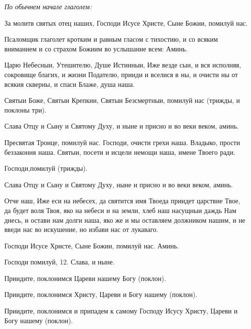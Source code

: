 \itshape По обычнем начале глаголем:\normalfont{}


За молитв святых отец наших, Господи Исусе Христе, Сыне Божии, помилуй нас.

Псаломщик глаголет кротким и равным гласом с тихостию, и со всяким вниманием и со страхом Божиим во услышание всем: Аминь.

Царю Небесныи, Утешителю, Душе Истинныи, Иже везде сыи, и вся исполняя, сокровище благих, и жизни Подателю, прииди и вселися в ны, и очисти ны от всякия скверны, и спаси Блаже, душа наша.

Святыи Боже, Святыи Крепкии, Святыи Безсмертныи, помилуй нас (трижды, и поклоны три). 

Слава Отцу и Сыну и Святому Духу, и ныне и присно и во веки веком, аминь.

Пресвятая Троице, помилуй нас. Господи, очисти грехи наша. Владыко, прости беззакония наша. Святыи, посети и исцели немощи наша, имене Твоего ради.

Господи,помилуй (трижды).

Слава Отцу и Сыну и Святому Духу, ныне и присно и во веки веком, аминь.

Отче наш, Иже еси на небесех, да святится имя Твоеда приидет царствие Твое, да будет воля Твоя, яко на небеси и на земли, хлеб наш насущныи даждь Нам днесь, и остави нам долги наша, яко же и мы оставляем должником нашим, и не введи нас во искушение, но избави нас от лукаваго.

Господи Исусе Христе, Сыне Божии, помилуй нас. Аминь.

Господи помилуй, 12. Слава, и ныне.

Приидите, поклонимся Цареви нашему Богу (поклон).

Приидите, поклонимся Христу, Цареви и Богу нашему (поклон).

Приидите, поклонимся и припадем к самому Господу Исусу Христу, Цареви и Богу нашему (поклон).




